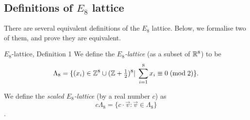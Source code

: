\subsection{Definitions of $E_8$ lattice}

There are several equivalent definitions of the $E_8$ lattice. Below, we formalise two of them, and prove they are equivalent.

\begin{definition}{$E_8$-lattice, Definition 1}\label{E8_Set}\leanok
  We define the \emph{$E_8$-lattice} (as a subset of $\mathbb{R}^8$) to be
$$\Lambda_8=\{(x_i)\in\mathbb{Z}^8\cup(\mathbb{Z}+\textstyle\frac12\displaystyle )^8|\;\sum_{i=1}^8x_i\equiv 0\;(\mathrm{mod\;2})\}.$$
\end{definition}

\begin{definition}\label{E8_Scaled_Set}\leanok
  We define the \emph{scaled $E_8$-lattice} (by a real number $c$) as $$c\Lambda_8 = \{c \cdot \vec{v} : \vec{v} \in \Lambda_8\}$$.
\end{definition}


